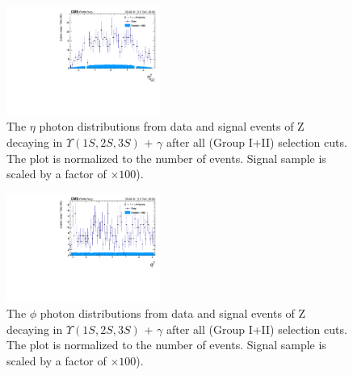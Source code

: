 \begin{figure}[!htbp]
\begin{center}
\includegraphics[width=0.45\textwidth]{figures_and_tables/outputPlots/ZtoUpsilon_Cat0_ZZZZZ/nEvts/data_x_mc/withKinCuts/h_withKin_Photon_eta}\hspace*{1.cm}
\end{center}\vspace*{-.5cm}
\caption{The $\eta$ photon distributions from data and signal events of Z decaying in $\Upsilon(1S,2S,3S)$ + $\gamma$ after all (Group I+II) selection cuts. The plot is normalized to the number of events. Signal sample is scaled by a factor of $\times 100$).}
\label{fig:etaPhoton_ZtoUpsilon_Cat0_groupI_plus_II}
\end{figure}

\begin{figure}[!htbp]
\begin{center}
\includegraphics[width=0.45\textwidth]{figures_and_tables/outputPlots/ZtoUpsilon_Cat0_ZZZZZ/nEvts/data_x_mc/withKinCuts/h_withKin_Photon_phi}\hspace*{1.cm}
\end{center}\vspace*{-.5cm}
\caption{The $\phi$ photon distributions from data and signal events of Z decaying in $\Upsilon(1S,2S,3S)$ + $\gamma$ after all (Group I+II) selection cuts. The plot is normalized to the number of events. Signal sample is scaled by a factor of $\times 100$).}
\label{fig:phiPhoton_ZtoUpsilon_Cat0_groupI_plus_II}
\end{figure}

